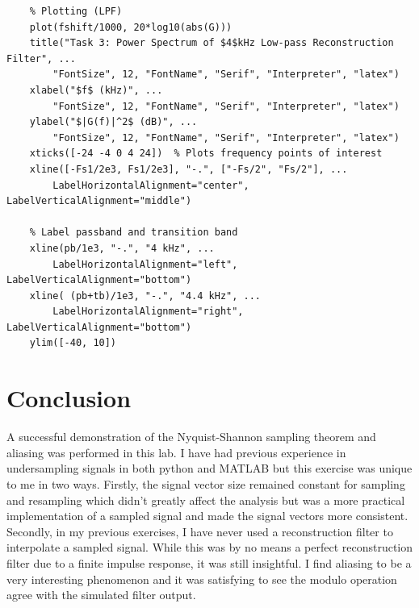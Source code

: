 \documentclass[a4paper,12pt]{article}
\begin{document}
\begin{lstlisting}
    % Plotting (LPF)
    plot(fshift/1000, 20*log10(abs(G)))
    title("Task 3: Power Spectrum of $4$kHz Low-pass Reconstruction Filter", ...
        "FontSize", 12, "FontName", "Serif", "Interpreter", "latex")
    xlabel("$f$ (kHz)", ...
        "FontSize", 12, "FontName", "Serif", "Interpreter", "latex")
    ylabel("$|G(f)|^2$ (dB)", ...
        "FontSize", 12, "FontName", "Serif", "Interpreter", "latex")
    xticks([-24 -4 0 4 24])  % Plots frequency points of interest
    xline([-Fs1/2e3, Fs1/2e3], "-.", ["-Fs/2", "Fs/2"], ...
        LabelHorizontalAlignment="center", LabelVerticalAlignment="middle")
    
    % Label passband and transition band
    xline(pb/1e3, "-.", "4 kHz", ...
        LabelHorizontalAlignment="left", LabelVerticalAlignment="bottom")
    xline( (pb+tb)/1e3, "-.", "4.4 kHz", ...
        LabelHorizontalAlignment="right", LabelVerticalAlignment="bottom")
    ylim([-40, 10])

\end{lstlisting}



\section*{Conclusion}
A successful demonstration of the Nyquist-Shannon sampling theorem and aliasing was performed in this lab. I have had previous experience in undersampling signals in both python and MATLAB but this exercise was unique to me in two ways. Firstly, the signal vector size remained constant for sampling and resampling which didn't greatly affect the analysis but was a more practical implementation of a sampled signal and made the signal vectors more consistent. Secondly, in my previous exercises, I have never used a reconstruction filter to interpolate a sampled signal. While this was by no means a perfect reconstruction filter due to a finite impulse response, it was still insightful. I find aliasing to be a very interesting phenomenon and it was satisfying to see the modulo operation agree with the simulated filter output.
\end{document}
